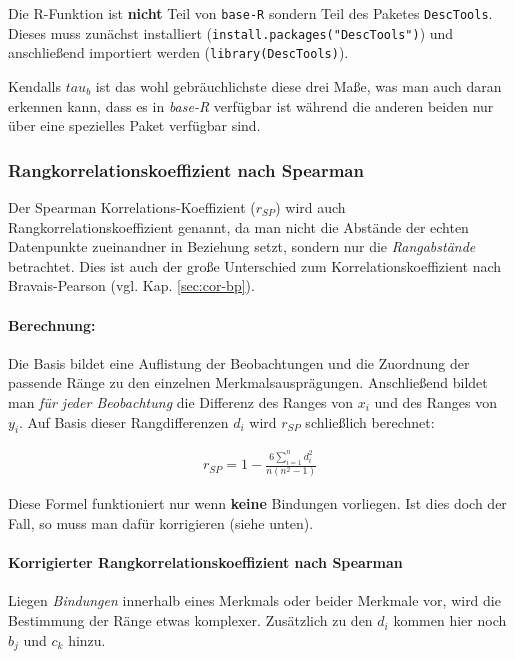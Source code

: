 \documentclass[a4paper]{article}
\newcommand\dangersign{%
 \makebox[1.8em][c]{%
 \makebox[0pt][c]{\raisebox{.15em}{\small!}}%
 \makebox[0pt][c]{\color{red}\Large$\triangle$}}}%
\begin{document}
\noindent \dangersign Die R-Funktion ist \textbf{nicht} Teil von \texttt{base-R} sondern Teil des Paketes \texttt{DescTools}. Dieses muss zunächst installiert (\texttt{install.packages("DescTools")}) und anschließend importiert werden (\texttt{library(DescTools)}).

\noindent \dangersign Kendalls $tau_b$ ist das wohl gebräuchlichste diese drei Maße, was man auch daran erkennen kann, dass es in \textit{base-R} verfügbar ist während die anderen beiden nur über eine spezielles Paket verfügbar sind.

\subsubsection{Rangkorrelationskoeffizient nach Spearman}
Der Spearman Korrelations-Koeffizient ($r_{SP}$) wird auch Rangkorrelationskoeffizient genannt, da man nicht die Abstände der echten Datenpunkte zueinandner in Beziehung setzt, sondern nur die \textit{Rangabstände} betrachtet. Dies ist auch der große Unterschied zum Korrelationskoeffizient nach Bravais-Pearson (vgl. Kap. \ref{sec:cor-bp}).

\paragraph{Berechnung:} Die Basis bildet eine Auflistung der Beobachtungen und die Zuordnung der passende Ränge zu den einzelnen Merkmalsausprägungen. Anschließend bildet man \textit{für jeder Beobachtung} die Differenz des Ranges von $x_i$ und des Ranges von $y_i$. Auf Basis dieser Rangdifferenzen $d_i$ wird $r_{SP}$ schließlich berechnet:

\begin{align*}
    r_{SP}=1-\frac{6\sum_{i=1}^nd_i^2}{n(n^2-1)}
\end{align*}

\noindent \dangersign Diese Formel funktioniert nur wenn \textbf{keine} Bindungen vorliegen. Ist dies doch der Fall, so muss man dafür korrigieren (siehe unten).

\paragraph{Korrigierter Rangkorrelationskoeffizient nach Spearman} Liegen \textit{Bindungen} innerhalb eines Merkmals oder beider Merkmale vor, wird die Bestimmung der Ränge etwas komplexer. Zusätzlich zu den $d_i$ kommen hier noch $b_j$ und $c_k$ hinzu.\\
\end{document}
